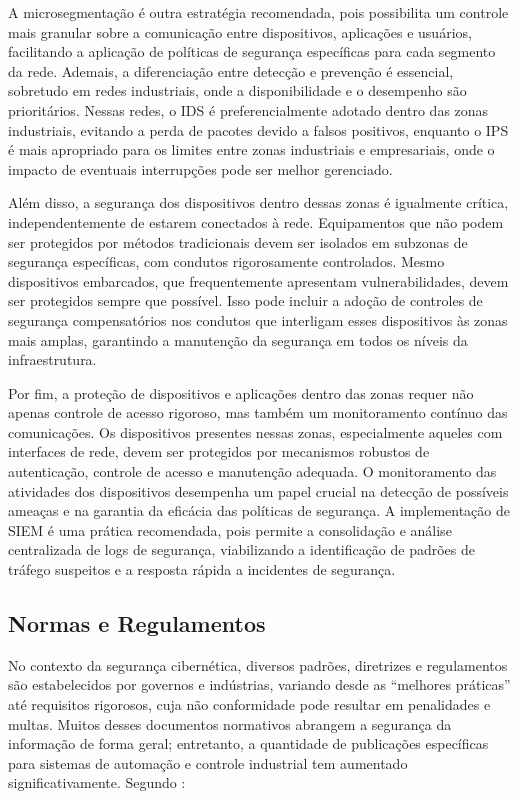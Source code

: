         A microsegmentação é outra estratégia recomendada, pois possibilita um controle mais granular sobre a comunicação entre dispositivos, aplicações e usuários, facilitando a aplicação de políticas de segurança específicas para cada segmento da rede. Ademais, a diferenciação entre detecção e prevenção é essencial, sobretudo em redes industriais, onde a disponibilidade e o desempenho são prioritários. Nessas redes, o IDS é preferencialmente adotado dentro das zonas industriais, evitando a perda de pacotes devido a falsos positivos, enquanto o IPS é mais apropriado para os limites entre zonas industriais e empresariais, onde o impacto de eventuais interrupções pode ser melhor gerenciado.

        Além disso, a segurança dos dispositivos dentro dessas zonas é igualmente crítica, independentemente de estarem conectados à rede. Equipamentos que não podem ser protegidos por métodos tradicionais devem ser isolados em subzonas de segurança específicas, com condutos rigorosamente controlados. Mesmo dispositivos embarcados, que frequentemente apresentam vulnerabilidades, devem ser protegidos sempre que possível. Isso pode incluir a adoção de controles de segurança compensatórios nos condutos que interligam esses dispositivos às zonas mais amplas, garantindo a manutenção da segurança em todos os níveis da infraestrutura.

        Por fim, a proteção de dispositivos e aplicações dentro das zonas requer não apenas controle de acesso rigoroso, mas também um monitoramento contínuo das comunicações. Os dispositivos presentes nessas zonas, especialmente aqueles com interfaces de rede, devem ser protegidos por mecanismos robustos de autenticação, controle de acesso e manutenção adequada. O monitoramento das atividades dos dispositivos desempenha um papel crucial na detecção de possíveis ameaças e na garantia da eficácia das políticas de segurança. A implementação de SIEM é uma prática recomendada, pois permite a consolidação e análise centralizada de logs de segurança, viabilizando a identificação de padrões de tráfego suspeitos e a resposta rápida a incidentes de segurança.


    \subsection{Normas e Regulamentos}

        No contexto da segurança cibernética, diversos padrões, diretrizes e regulamentos são estabelecidos por governos e indústrias, variando desde as ``melhores práticas'' até requisitos rigorosos, cuja não conformidade pode resultar em penalidades e multas. Muitos desses documentos normativos abrangem a segurança da informação de forma geral; entretanto, a quantidade de publicações específicas para sistemas de automação e controle industrial tem aumentado significativamente. Segundo :

